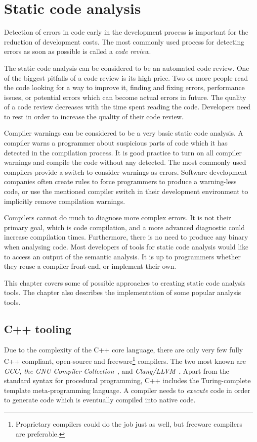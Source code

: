 \chapter{Static code analysis}
Detection of errors in code early in the development process is important for the reduction of development costs. The most commonly used process for detecting errors as soon as possible is called a \emph{code review}.

The static code analysis can be considered to be an automated code review. One of the biggest pitfalls of a code review is its high price. Two or more people read the code looking for a way to improve it, finding and fixing errors, performance issues, or potential errors which can become actual errors in future. The quality of a code review decreases with the time spent reading the code. Developers need to rest in order to increase the quality of their code review.

Compiler warnings can be considered to be a very basic static code analysis. A compiler warns a programmer about suspicious parts of code which it has detected in the compilation process. It is good practice to turn on all compiler warnings and compile the code without any detected. The most commonly used compilers provide a switch to consider warnings as errors. Software development companies often create rules to force programmers to produce a warning-less code, or use the mentioned compiler switch in their development environment to implicitly remove compilation warnings.

Compilers cannot do much to diagnose more complex errors. It is not their primary goal, which is code compilation, and a more advanced diagnostic could increase compilation times. Furthermore, there is no need to produce any binary when analysing code. Most developers of tools for static code analysis would like to access an output of the semantic analysis. It is up to programmers whether they reuse a compiler front-end, or implement their own.

This chapter covers some of possible approaches to creating static code analysis tools. The chapter also describes the implementation of some popular analysis tools.

\section{C++ tooling}
Due to the complexity of the C++ core language, there are only very few fully C++ compliant, open-source and freeware\footnote{Proprietary compilers could do the job just as well, but freeware compilers are preferable.} compilers. The two most known are \emph{GCC, the GNU Compiler Collection}~\cite{gcc}, and \emph{Clang/LLVM}~\cite{clang}. Apart from the standard syntax for procedural programming, C++ includes the Turing-complete template meta-programming language. A compiler needs to \textit{execute} code in order to generate code which is eventually compiled into native code.

